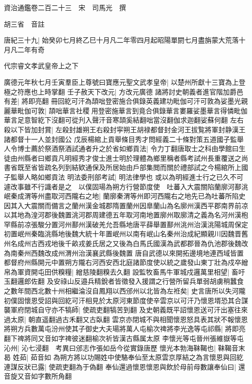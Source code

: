 資治通鑑卷二百二十三　宋　司馬光　撰

胡三省　音註

唐紀三十九|{
	始癸卯七月終乙巳十月凡二年零四月起昭陽單閼七月盡旃蒙大荒落十月凡二年有奇}


代宗睿文孝武皇帝上之下

廣德元年秋七月壬寅羣臣上尊號曰寶應元聖文武孝皇帝|{
	以楚州所獻十三寶為上登極之符應也上時掌翻}
壬子赦天下改元|{
	方改元廣德}
諸將討史朝義者進官階加爵邑有差|{
	將即亮翻}
冊回紇可汗為頡咄登密施合俱錄英義建功毗伽可汗可敦為娑墨光親麗華毗伽可敦|{
	頡咄華言社稷用登密施華言到竟合俱錄華言婁羅娑墨華言得憐毗伽華言足意智紇下沒翻可從刋入聲汗音寒頡奚結翻咄當沒翻伽求迦翻娑蘇何翻}
左右殺以下皆加封賞|{
	左殺封雄朔王右殺封寜朔王胡禄都督封金河王拔覧將軍封静漢王諸都督十一人並封國公}
戊辰楊綰上貢舉條目秀才問經義二十條對策五道國子監舉人令博士薦於祭酒祭酒試通者升之於省如鄉貢法|{
	令力丁翻唐取士之科由學館曰生徒由州縣者曰鄉貢凡明經秀才俊士進士明於理體為鄉里稱者縣考試州長重覆送之尚書省既至省皆疏名列到結欵通保及所居始由戶部集閲而關於禮部試之今楊綰所上國子監舉人略如鄉貢法}
明法委刑部考試|{
	明法律學也}
或以為明經進士行之已久不可遽改事雖不行識者是之　以僕固瑒為朔方行營節度使　吐蕃入大震關陷蘭廓河鄯洮岷秦成渭等州盡取河西隴右之地|{
	蘭廓秦渭等州即河西隴右之地先已為吐蕃所陷史因其入大震關而備言之蘭州漢金城郡隋置蘭州因臯蘭山為名廓州漢西平郡南界前凉以其地為湟河郡後魏置洮河郡周建德五年取河南地置廓州取廓清之義為名河州漢枹罕縣前凉張駿分置河州鄯州漢破羌允吾縣地唐平薛舉置鄯州洮州治漢洮陽城周保定初置岷州秦臨洮縣地後魏大統十年置岷州以南有岷山名秦州治成紀顯親川因魏晋舊州名成州古西戎地後千畝戎姜氏居之又後為白馬氏國漢為武都郡晉為仇池郡後魏改為南秦州西魏改成州渭州治漢襄武縣後魏置}
唐自武德以來開拓邊境地連西域皆置都督府州縣開元中置朔方隴右河西安西北庭諸節度使以統之歲發山東丁壯為戍卒繒帛為軍資開屯田供糗糧|{
	繒慈陵翻糗去久翻}
設監牧畜馬牛軍城戍邏萬里相望|{
	畜吁玉翻邏郎佐翻}
及安祿山反邉兵精銳者皆徵發入援謂之行營所留兵單弱胡虜稍蠶食之數年間西北數十州相繼淪沒自鳳翔以西邠州以北皆為左袵矣|{
	史言唐所以失河隴}
初僕固懷恩受詔與回紇可汗相見於太原河東節度使辛雲京以可汗乃懷恩壻恐其合謀襲軍府閉城自守亦不犒師|{
	使疏吏翻犒苦到翻}
及史朝義既平詔懷恩送可汗出塞往來過太原|{
	朝直遥翻過古禾翻又古臥翻}
雲京亦閉城不與相聞懷恩怒具表其狀不報懷恩將朔方兵數萬屯汾州使其子御史大夫瑒將萬人屯榆次禆將李光逸等屯祁縣|{
	將即亮翻下禆將同又音如字禆彼迷翻榆次祈皆漢古縣属太原}
李懷光等屯晉州張維嶽等屯沁州|{
	沁七浸翻　考異曰邠志作張如岳今從實錄唐歷}
懷光本勃海靺鞨也|{
	靺鞨音末曷}
姓茹|{
	茹音如}
為朔方將以功賜姓中使駱奉仙至太原雲京厚結之為言懷恩與回紇連謀反狀已露|{
	使疏吏翻為于偽翻}
奉仙還過懷恩懷恩與飲於母前母數讓奉仙曰|{
	還音旋又音如字數所角翻}
